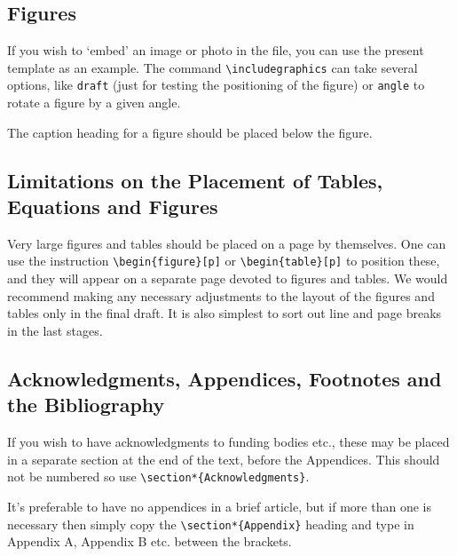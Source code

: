 \documentclass{blois}
\begin{document}
\subsection{Figures}\label{subsec:fig}

If you wish to `embed' an image or photo in the file, you can use
the present template as an example. The command 
\verb^\includegraphics^ can take several options, like
\verb^draft^ (just for testing the positioning of the figure)
or \verb^angle^ to rotate a figure by a given angle.

The caption heading for a figure should be placed below the figure.

\subsection{Limitations on the Placement of Tables,
Equations and Figures}\label{sec:plac}

Very large figures and tables should be placed on a page by themselves. One
can use the instruction \verb^\begin{figure}[p]^ or
\verb^\begin{table}[p]^
to position these, and they will appear on a separate page devoted to
figures and tables. We would recommend making any necessary
adjustments to the layout of the figures and tables
only in the final draft. It is also simplest to sort out line and
page breaks in the last stages.

\subsection{Acknowledgments, Appendices, Footnotes and the Bibliography}

If you wish to have
acknowledgments to funding bodies etc., these may be placed in a separate
section at the end of the text, before the Appendices. This should not
be numbered so use \verb^\section*{Acknowledgments}^.

It's preferable to have no appendices in a brief article, but if more
than one is necessary then simply copy the
\verb^\section*{Appendix}^
heading and type in Appendix A, Appendix B etc. between the brackets.
\end{document}

